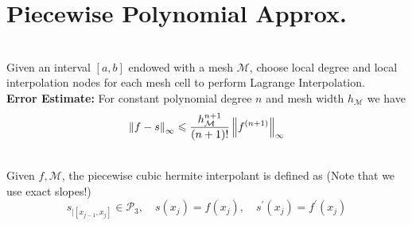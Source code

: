 \section{Piecewise Polynomial Approx.}

 \\
Given an interval $[a,b]$ endowed with a mesh $\mathcal{M}$, choose local degree and local interpolation nodes for each mesh cell to perform Lagrange Interpolation. \\
\textbf{Error Estimate:} For constant polynomial degree $n$ and mesh width $h_\mathcal{M}$ we have
$$\left\lVert f-s \right\rVert_\infty \leqslant \frac{h_{\mathcal{M}}^{n+1}}{(n+1) !}\left\lVert f^{(n+1)} \right\rVert_\infty$$ 


 \\
Given $f, \mathcal{M}$, the piecewise cubic hermite interpolant is defined as (Note that we use exact slopes!)
$$
s_{\mid\left[x_{j-1}, x_{j}\right]} \in \mathcal{P}_{3}, \quad s\left(x_{j}\right)=f\left(x_{j}\right), \quad s^{\prime}\left(x_{j}\right)=f^{\prime}\left(x_{j}\right)
$$ 

\begin{comment}
 
 ## Spline
  - Convergence in O(h^4)
 Spline vs Hermite?
 


Remaining: 
- Pullback 

\end{comment}


 
 

